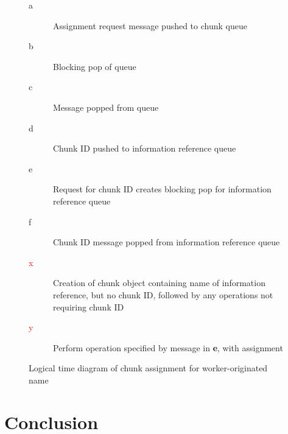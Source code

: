 \documentclass[a4paper,10pt]{article}
\begin{document}
\begin{figure}
	\begin{minipage}{0.4\textwidth}
	\end{minipage}
	\begin{minipage}{0.6\textwidth}
		\begin{description}
			\item [a] Assignment request message pushed to chunk
				queue
			\item [b] Blocking pop of queue
			\item [c] Message popped from queue
			\item [d] Chunk ID pushed to information reference
				queue
			\item [e] Request for chunk ID creates blocking pop for
				information reference queue
			\item [f] Chunk ID message popped from information
				reference queue
			\item [\textcolor{red}{x}] Creation of chunk object
				containing name of information reference, but
				no chunk ID, followed by any operations not
				requiring chunk ID
			\item [\textcolor{red}{y}] Perform operation specified
				by message in \textbf{e}, with assignment
		\end{description}
	\end{minipage}
	\caption{\label{fig:w-o-td}Logical time diagram of chunk assignment for
	worker-originated name}
\end{figure}

\section{Conclusion}
\end{document}
